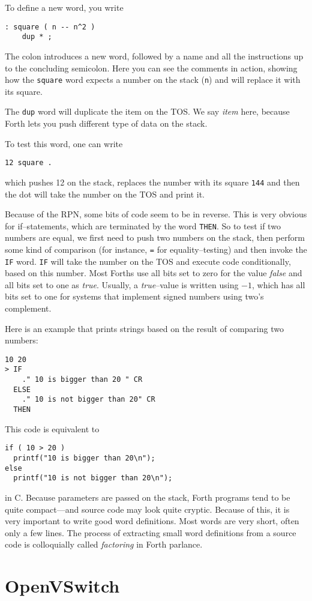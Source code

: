 To define a new word, you write

\begin{verbatim}
: square ( n -- n^2 )
    dup * ;
\end{verbatim}

The colon introduces a new word, followed by a name and all the instructions
up to the concluding semicolon.  Here you can see the comments in action,
showing how the \texttt{square} word expects a number on the stack
(\texttt{n}) and will replace it with its square.

The \texttt{dup} word will duplicate the item on the \ac{TOS}.  We
say \textit{item} here, because Forth lets you push different type of data
on the stack.

To test this word, one can write 
\begin{verbatim}
12 square .
\end{verbatim}

which pushes 12 on the stack, replaces the number with its square
\texttt{144} and then the dot will take the number on the \ac{TOS}
and print it.

Because of the \ac{RPN}, some bits of code seem to be in reverse.  This is
very obvious for if--statements, which are terminated by the word
\texttt{THEN}.  So to test if two numbers are equal, we first need to push
two numbers on the stack, then perform some kind of comparison (for
instance, \texttt{=} for equality--testing) and then invoke the
\texttt{IF} word.  \texttt{IF} will take the number on the \ac{TOS}
and execute code conditionally, based on this number.  Most Forths use all
bits set to zero for the value \textit{false} and all bits set to one as
\textit{true}.  Usually, a \textit{true}--value is written using $-1$,
which has all bits set to one for systems that implement signed numbers
using two's complement.

Here is an example that prints strings based on the result of comparing two
numbers:

\begin{verbatim}
10 20
> IF
    ." 10 is bigger than 20 " CR
  ELSE
    ." 10 is not bigger than 20" CR
  THEN
\end{verbatim}

This code is equivalent to

\begin{verbatim}
if ( 10 > 20 )
  printf("10 is bigger than 20\n");
else
  printf("10 is not bigger than 20\n");
\end{verbatim}

in C.  Because parameters are passed on the stack, Forth programs tend to be
quite compact---and source code may look quite cryptic.  Because of this, it
is very important to write good word definitions.  Most words are very
short, often only a few lines.  The process of extracting small word
definitions from a source code is colloquially called \textit{factoring} in
Forth parlance.

\section{OpenVSwitch}

